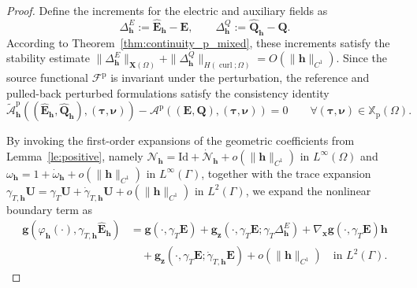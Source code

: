\documentclass[12pt,reqno]{amsart}
\theoremstyle{definition}
\numberwithin{equation}{section}
\begin{document}
\begin{proof}
Define the increments for the electric and auxiliary fields as
\[
\Delta_{\mathbf{h}}^E := \hat{\mathbf{E}}_{\mathbf{h}} - \mathbf{E}, \qquad \Delta_{\mathbf{h}}^Q := \hat{\mathbf{Q}}_{\mathbf{h}} - \mathbf{Q}.
\]
According to Theorem~\ref{thm:continuity_p_mixed}, these increments satisfy the stability estimate $\|\Delta_{\mathbf{h}}^E\|_{\mathbf{X}(\Omega)} + \|\Delta_{\mathbf{h}}^Q\|_{H(\operatorname{curl};\Omega)} = O(\|\mathbf{h}\|_{C^1})$. Since the source functional $\mathcal{F}^{\mathrm{p}}$ is invariant under the perturbation, the reference and pulled-back perturbed formulations satisfy the consistency identity
\begin{equation}\label{eq:NPEC_consistency}
\widetilde{\mathcal{A}}^{\mathrm{p}}_{\mathbf{h}}((\hat{\mathbf{E}}_{\mathbf{h}}, \hat{\mathbf{Q}}_{\mathbf{h}}), (\boldsymbol{\tau}, \boldsymbol{\nu})) - \mathcal{A}^{\mathrm{p}}((\mathbf{E}, \mathbf{Q}), (\boldsymbol{\tau}, \boldsymbol{\nu})) = 0 \qquad \forall (\boldsymbol{\tau}, \boldsymbol{\nu}) \in \mathbb{X}_{\mathrm{p}}(\Omega).
\end{equation}

By invoking the first-order expansions of the geometric coefficients from Lemma~\ref{le:positive}, namely $\mathcal{N}_{\mathbf{h}} = \mathrm{Id} + \dot{\mathcal{N}}_{\mathbf{h}} + o(\|\mathbf{h}\|_{C^1})$ in $L^\infty(\Omega)$ and $\omega_{\mathbf{h}} = 1 + \dot{\omega}_{\mathbf{h}} + o(\|\mathbf{h}\|_{C^1})$ in $L^\infty(\Gamma)$, together with the trace expansion $\gamma_{T,\mathbf{h}}\mathbf{U} = \gamma_T\mathbf{U} + \dot{\gamma}_{T,\mathbf{h}}\mathbf{U} + o(\|\mathbf{h}\|_{C^1})$ in $L^2(\Gamma)$, we expand the nonlinear boundary term as
\[
\begin{aligned}
\mathbf{g}(\varphi_{\mathbf{h}}(\cdot), \gamma_{T,\mathbf{h}}\hat{\mathbf{E}}_{\mathbf{h}}) &= \mathbf{g}(\cdot, \gamma_T\mathbf{E}) + \mathbf{g}_{\boldsymbol{z}}(\cdot, \gamma_T\mathbf{E}; \gamma_T\Delta_{\mathbf{h}}^E) + \nabla_{\boldsymbol{x}}\mathbf{g}(\cdot, \gamma_T\mathbf{E})\mathbf{h} \\
&\quad + \mathbf{g}_{\boldsymbol{z}}(\cdot, \gamma_T\mathbf{E}; \dot{\gamma}_{T,\mathbf{h}}\mathbf{E}) + o(\|\mathbf{h}\|_{C^1}) \quad \text{in } L^2(\Gamma).
\end{aligned}
\]


\end{proof}
\end{document}
